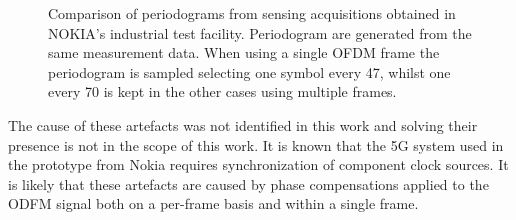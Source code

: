 \begin{figure}[H]
{			}\hfill
			\caption[]{\small Comparison of periodograms from sensing acquisitions obtained in NOKIA's industrial test facility.
				Periodogram are generated from the same measurement data. When using a single OFDM frame the periodogram is sampled selecting one symbol every 47, whilst one every 70 is kept in the other cases using multiple frames.  }
			\label{fig:TDD_artefacts}
		\end{figure}
		
		The cause of these artefacts was not identified in this work and solving their presence is not in the scope of this work. It is known that the 5G system used in the prototype from Nokia requires synchronization of component clock sources.
		It is likely that these artefacts are caused by phase compensations applied to the ODFM signal both on a per-frame basis and within a single frame.